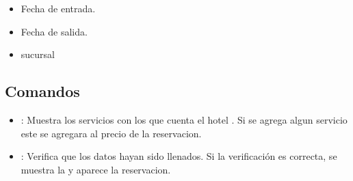 	\begin{itemize}
		\item Fecha de entrada.
		\item Fecha de salida.
		\item sucursal
	\end{itemize}

\subsection{Comandos}

\begin{itemize}
	\item {}: Muestra los servicios con los que cuenta el hotel . Si se agrega algun servicio este se agregara al precio de la reservacion.
	\item {}: Verifica que los datos hayan sido llenados. Si la verificación es correcta, se muestra la  y aparece la reservacion.
\end{itemize}

